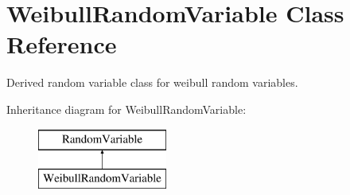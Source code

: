 \section{Weibull\+Random\+Variable Class Reference}
\label{classPecos_1_1WeibullRandomVariable}


Derived random variable class for weibull random variables.  


Inheritance diagram for Weibull\+Random\+Variable\+:\begin{figure}[H]
\begin{center}
\leavevmode
\includegraphics[height=2.000000cm]{classPecos_1_1WeibullRandomVariable}
\end{center}
\end{figure}
